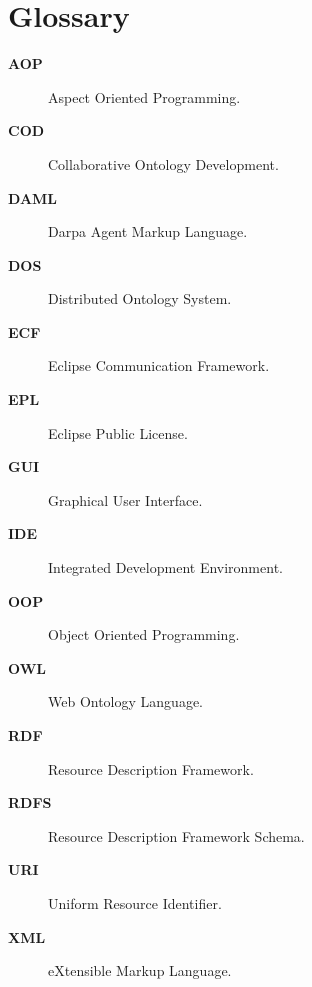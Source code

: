 \chapter{Glossary}
\label{anhang_e}







\begin{description}

\item[\bf{AOP}] Aspect Oriented Programming.
\item[\bf{COD}] Collaborative Ontology Development.
\item[\bf{DAML}] Darpa Agent Markup Language.
\item[\bf{DOS}] Distributed Ontology System.
\item[\bf{ECF}] Eclipse Communication Framework.
\item[\bf{EPL}] Eclipse Public License.
\item[\bf{GUI}] Graphical User Interface.
\item[\bf{IDE}] Integrated Development Environment.
\item[\bf{OOP}] Object Oriented Programming.
\item[\bf{OWL}] Web Ontology Language.
\item[\bf{RDF}] Resource Description Framework.
\item[\bf{RDFS}] Resource Description Framework Schema.
\item[\bf{URI}] Uniform Resource Identifier.
\item[\bf{XML}] eXtensible Markup Language.


\end{description}




